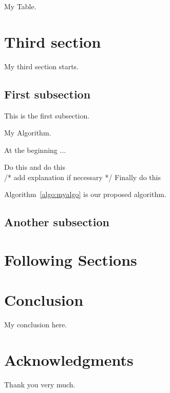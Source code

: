 \documentclass[11pt,a4paper,onecolumn,oneside]{report}
\begin{document}
        \begin{table}[h]
            \caption{My Table.}
            \label{tab:mytable}
        \end{table}
    \newpage

    \section{Third section}
    My third section starts.

        \subsection{First subsection}
            This is the first subsection.

            \begin{algorithm}
            	\caption{My Algorithm.} \label{algo:myalgo}
                At the beginning ...

            	\begin{algorithmic}[1]
            	    \STATE Do this
                    \STATE and do this\\
                    /* add explanation if necessary */
                    \STATE Finally do this
            	\end{algorithmic}
            \end{algorithm}

            Algorithm~\ref{algo:myalgo} is our proposed algorithm.

        \subsection{Another subsection}
    \newpage

    \section{Following Sections}
    \newpage

    \section{Conclusion}
        My conclusion here.
    \clearpage

    
    
    \clearpage


    \section*{\hfill \Large Acknowledgments \hfill}
        Thank you very much.
    \clearpage

\hbox{ }
\thispagestyle{empty}
\clearpage
\end{document}
